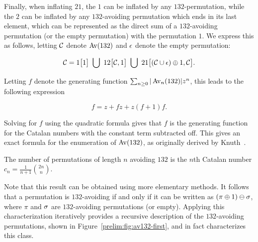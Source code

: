     Finally, when inflating $21$, the $1$ can be inflated by any
    $132$-permutation, while the $2$ can be inflated by any $132$-avoiding
    permutation which ends in its last element, which can be represented as the
    direct sum of a $132$-avoiding permutation (or the empty permutation) with
    the permutation $1$. We express this as follows, letting $\mathcal{C}$ denote $\operatorname{{Av}}
    (132)$ and $\epsilon$ denote the empty permutation:

    $$ \C =  1\big[1\big] \ \bigcup \ 12\big[\C, 1\big] \ \bigcup \
        21\big[(\C \cup \eps) \dsum 1, \C\big]. $$

    Letting $f$ denote the generating function $\sum_{n \geq 0} |\operatorname{{Av}}_n (132)|
    z^n$, this leads to the following expression

    $$ f =  z + fz  + z(f+1)f .$$

    Solving for $f$ using the quadratic formula gives that $f$ is the generating
    function for the Catalan numbers with the constant term subtracted off.
    This gives an exact formula for the enumeration of $\operatorname{{Av}} (132)$, 
    as originally derived by Knuth~\cite{Knuth}. 
    
    \begin{theorem} \label{prelim:thm:av132}
      The number of permutations of length $n$ avoiding $132$ is the $n$th Catalan
      number $c_n = \frac{1}{n+1}\binom{2n}{n}$. 
    \end{theorem}


    Note that this result can be obtained using more elementary methods. 
    It follows that a permutation is $132$-avoiding if and only if it can be
    written as $(\pi \oplus 1) \ominus \sigma$, where $\pi$ and $\sigma$ are
    $132$-avoiding permutations (or empty). Applying this characterization
    iteratively provides a recursive description of the $132$-avoiding
    permutations, shown in Figure~\ref{prelim:fig:av132-first}, and in fact
    characterizes this class.


